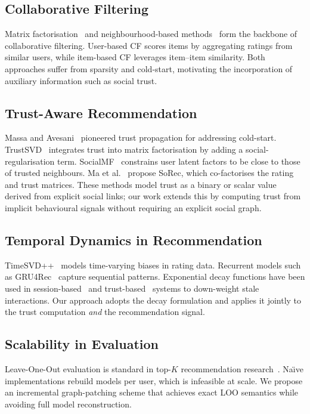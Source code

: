 \documentclass[conference]{IEEEtran}
\begin{document}
\subsection{Collaborative Filtering}
Matrix factorisation~\cite{koren2009matrix} and neighbourhood-based
methods~\cite{sarwar2001item} form the backbone of collaborative
filtering.  User-based CF scores items by aggregating ratings from
similar users, while item-based CF leverages item--item similarity.  Both
approaches suffer from sparsity and cold-start, motivating the
incorporation of auxiliary information such as social trust.

\subsection{Trust-Aware Recommendation}
Massa and Avesani~\cite{massa2007trust} pioneered trust propagation for
addressing cold-start.  TrustSVD~\cite{guo2015trustsvd} integrates trust
into matrix factorisation by adding a social-regularisation term.
SocialMF~\cite{jamali2010matrix} constrains user latent factors to be
close to those of trusted neighbours.  Ma et al.~\cite{ma2011recommender}
propose SoRec, which co-factorises the rating and trust matrices.  These
methods model trust as a binary or scalar value derived from explicit
social links; our work extends this by computing trust from implicit
behavioural signals without requiring an explicit social graph.

\subsection{Temporal Dynamics in Recommendation}
TimeSVD++~\cite{koren2010collaborative} models time-varying biases in
rating data.  Recurrent models such as GRU4Rec~\cite{hidasi2016session}
capture sequential patterns.  Exponential decay functions have been used
in session-based~\cite{li2017neural} and trust-based~\cite{wang2016social}
systems to down-weight stale interactions.  Our approach adopts the decay
formulation and applies it jointly to the trust computation \emph{and} the
recommendation signal.

\subsection{Scalability in Evaluation}
Leave-One-Out evaluation is standard in top-$K$ recommendation
research~\cite{he2017neural}.  Na\"{\i}ve implementations rebuild models per
user, which is infeasible at scale.  We propose an incremental
graph-patching scheme that achieves exact LOO semantics while avoiding
full model reconstruction.
\end{document}
